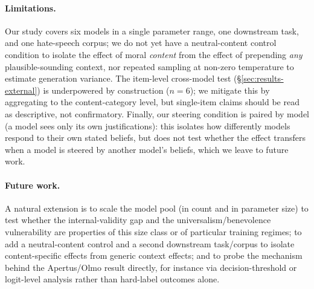 \paragraph{Limitations.} Our study covers six models in a single parameter range, one
downstream task, and one hate-speech corpus; we do not yet have a neutral-content
control condition to isolate the effect of moral \emph{content} from the effect of
prepending \emph{any} plausible-sounding context, nor repeated sampling at
non-zero temperature to estimate generation variance. The item-level cross-model test
(\S\ref{sec:results-external}) is underpowered by construction ($n=6$); we mitigate
this by aggregating to the content-category level, but single-item claims should be
read as descriptive, not confirmatory. Finally, our steering condition is paired by
model (a model sees only its own justifications): this isolates how differently
models respond to their own stated beliefs, but does not test whether the effect
transfers when a model is steered by another model's beliefs, which we leave to future
work.

\paragraph{Future work.} A natural extension is to scale the model pool (in count and
in parameter size) to test whether the internal-validity gap and the
universalism/benevolence vulnerability are properties of this size class or of
particular training regimes; to add a neutral-content control and a second downstream
task/corpus to isolate content-specific effects from generic context effects; and to
probe the mechanism behind the Apertus/Olmo result directly, for instance via
decision-threshold or logit-level analysis rather than hard-label outcomes alone.
